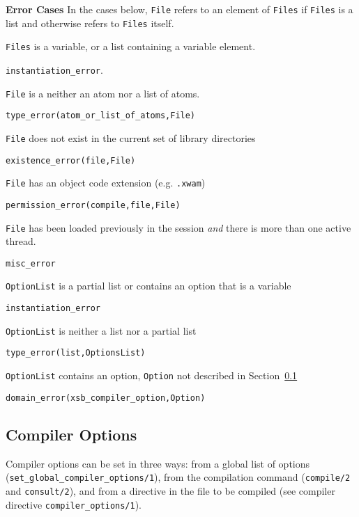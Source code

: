 \begin{description}
{\bf Error Cases}
In the cases below, {\tt File} refers to an element of {\tt Files} if
{\tt Files} is a list and otherwise refers to {\tt Files} itself.
\bi
\item 	{\tt Files} is a variable, or a list containing a variable element.
\bi
\item 	{\tt instantiation\_error}.
\ei
\item  {\tt File} is a neither an atom nor a list of atoms.
\bi
\item 	{\tt type\_error(atom\_or\_list\_of\_atoms,File)}
\ei
\item  {\tt File} does not exist in the current set of
  library directories 
\bi
\item 	{\tt existence\_error(file,File)}
\ei
%
\item 	{\tt File} has an object code extension (e.g. {\tt .xwam})
\bi
\item 	{\tt permission\_error(compile,file,File)}
\ei
%
\item {\tt File} has been loaded previously in the session {\em and}
  there is more than one active thread.  
\bi
\item 	{\tt misc\_error}
\ei
\item 	{\tt OptionList} is a partial list or contains an option that is a variable
\bi
\item 	{\tt instantiation\_error}
\ei
\item 	{\tt OptionList} is neither a list nor a partial list
\bi
\item 	{\tt type\_error(list,OptionsList)}
\ei
\item {\tt OptionList} contains an option, {\tt Option} not described
  in Section~\ref{sec:CompilerOptions} 
\bi
\item 	{\tt domain\_error(xsb\_compiler\_option,Option)}
\ei
\ei

\end{description}

\subsection{Compiler Options}\label{sec:CompilerOptions}

Compiler options can be set in three ways: from a global list of
options ({\tt set\_global\_compiler\_options/1}), from the
compilation command ({\tt compile/2} and {\tt consult/2}), and
from a directive in the file to be compiled (see compiler directive
{\tt compiler\_options/1}).

